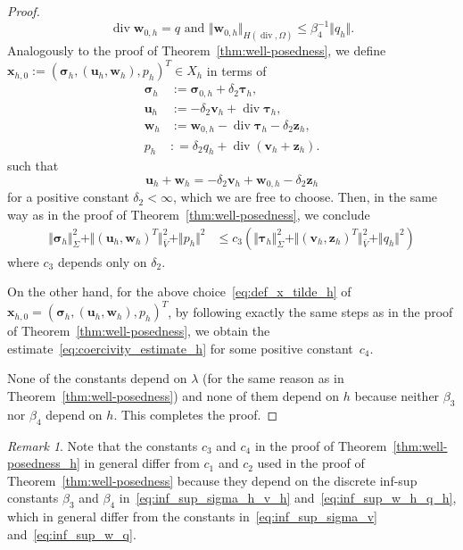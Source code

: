 \documentclass[11pt]{amsart}
\theoremstyle{remark}
\newtheorem{remark}{Remark}
\theoremstyle{definition}
\def\sig{{\bm \sigma}}
\def\btau{{\bm \tau}}
\def\bu{{\boldsymbol u}}
\def\bv{{\boldsymbol v}}
\def\bw{{\boldsymbol w}}
\def\tbx{{\bx}}
\def\tsig{\sig}
\def\tbu{{\bu}}
\def\tbw{{\bw}}
\def\tp{{p}}
\renewcommand{\div}{\operatorname{div}}
\renewcommand{\div}{\operatorname{div}}
\def\sig{\boldsymbol \sigma}
\def\bu{\boldsymbol u}
\def\bv{\boldsymbol v}
\def\bw{\boldsymbol w}
\def\bx{\boldsymbol x}
\def\bz{\boldsymbol z}
\begin{document}
\begin{proof}
\begin{equation}
\div \bw_{0,h} = q \mbox{ and } \Vert \bw_{0,h} \Vert_{H(\div,\Omega)} \le \beta_{4}^{-1} \Vert q_h \Vert .
\end{equation}
%
Analogously to the proof of Theorem~\ref{thm:well-posedness}, we define $\tbx_{h,0} := (\tsig_h,(\tbu_h,\tbw_h), \tp_h)^T \in X_h$ in terms of
%
\begin{subequations}\label{eq:def_x_tilde_h}
\begin{align}   
\tsig_h & := \sig_{0,h} + \delta_2 \btau_h , \label{eq:def_sig_tilde} \\
\tbu_h & := - \delta_2 \bv_h + \div \btau_h , \label{eq:def_u_tilde}  \\
\tbw_h & := \bw_{0,h} - \div \btau_h - \delta_2 \bz_h , \label{eq:def_w_tilde}  \\
\tp_h & : = \delta_2 q_h + \div ( \bv_h + \bz_h ) . \label{eq:def_p_tilde}
\end{align}
\end{subequations}
such that
$$
\tbu_h + \tbw_h = - \delta_2 \bv_h + \bw_{0,h} - \delta_2 \bz_h 
$$
%
for a positive constant $\delta_2 < \infty$, which we are free to choose. Then, in the same way as in the proof of Theorem~\ref{thm:well-posedness}, we conclude
%
\begin{align*} 
\Vert \tsig_h \Vert_\Sigma^2 + \Vert (\tbu_h,\tbw_h)^T \Vert_{\bar{V}}^2 + \Vert \tp_h \Vert^2 
& \le c_{3} (\Vert \bm \tau_h \Vert_\Sigma^2 + \Vert (\bv_h,\bz_h)^T \Vert_{\bar{V}}^2 + \Vert q_h \Vert^2)
\end{align*}
%
where $c_{3}$ depends only on $\delta_2$.

On the other hand, for the above choice~\eqref{eq:def_x_tilde_h} of $\tbx_{h,0} = (\tsig_h,(\tbu_h,\tbw_h), \tp_h)^T$, by following exactly the same steps as in the proof of Theorem~\ref{thm:well-posedness}, we obtain the estimate~\eqref{eq:coercivity_estimate_h} for some positive constant~$c_{4}$. 

{
None of the constants depend on $\lambda$ (for the same reason as in
Theorem~\ref{thm:well-posedness}) and none of them depend on $h$ because neither $\beta_3$ nor $\beta_4$ depend
on $h$. This completes the proof.}
\end{proof}

\begin{remark}
Note that the constants $c_{3}$ and $c_{4}$ in the proof of Theorem~\ref{thm:well-posedness_h} in general differ from $c_1$ and $c_2$ used in the proof of Theorem~\ref{thm:well-posedness} because they depend on the discrete inf-sup constants $\beta_{3}$ and $\beta_{4}$ in~\eqref{eq:inf_sup_sigma_h_v_h} and~\eqref{eq:inf_sup_w_h_q_h}, which in general differ from the constants in~\eqref{eq:inf_sup_sigma_v} and~\eqref{eq:inf_sup_w_q}.
\end{remark}
\end{document}
